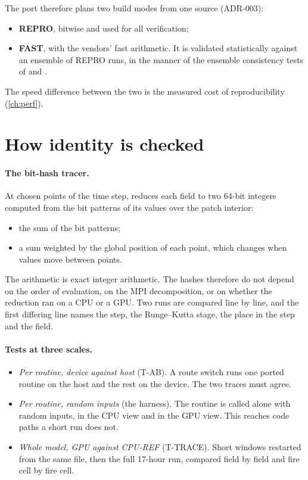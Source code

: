 The port therefore plans two build modes from one source (ADR-003):
\begin{itemize}
  \item \textbf{REPRO}, bitwise and used for all verification;
  \item \textbf{FAST}, with the vendors' fast arithmetic. It is validated statistically against an ensemble of REPRO
    runs, in the manner of the ensemble consistency tests of \citet{baker2015} and \citet{milroy2018}.
\end{itemize}
The speed difference between the two is the measured cost of reproducibility (\cref{ch:perf}).

\section{How identity is checked}

\paragraph{The bit-hash tracer.} At chosen points of the time step,  reduces each field to
two 64-bit integers computed from the bit patterns of its values over the patch interior:
\begin{itemize}
  \item the sum of the bit patterns;
  \item a sum weighted by the global position of each point, which changes when values move between points.
\end{itemize}
The arithmetic is exact integer arithmetic. The hashes therefore do not depend on the order of evaluation, on the
MPI decomposition, or on whether the reduction ran on a CPU or a GPU. Two runs are compared line by line, and the
first differing line names the step, the Runge--Kutta stage, the place in the step and the field.

\paragraph{Tests at three scales.}
\begin{itemize}
  \item \emph{Per routine, device against host} (T-AB). A route switch runs one ported routine on the host and the
    rest on the device. The two traces must agree.
  \item \emph{Per routine, random inputs} (the harness). The routine is called alone with random inputs, in the CPU
    view and in the GPU view. This reaches code paths a short run does not.
  \item \emph{Whole model, GPU against CPU-REF} (T-TRACE). Short windows restarted from the same file, then the full
    17-hour run, compared field by field and fire cell by fire cell.
\end{itemize}

